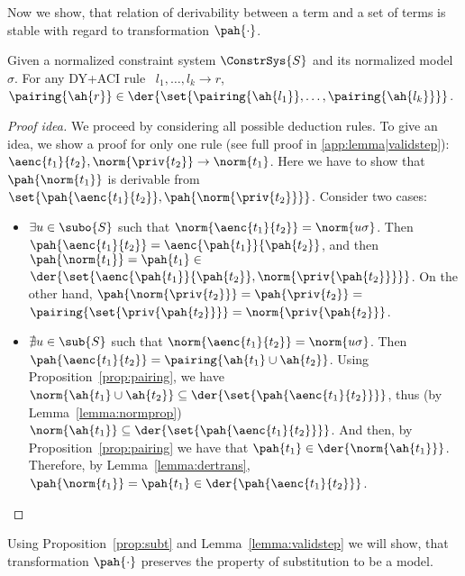 Now we show, that relation of derivability between a term and a set of terms is stable with regard to transformation $\pah{\cdot}$. 

\begin{lemma}\label{lemma:validstep}
Given a normalized constraint system $\ConstrSys{S}$ and its normalized model $\sigma$.
For any DY+ACI rule \ ${l_1,\dots,l_k}\rightarrow r$, \br $\pairing{\ah{r}} \in \der{\set{\pairing{\ah{l_1}}, \dots, \pairing{\ah{l_k}}} }$.


\begin{proof}[Proof idea] 
We proceed by considering all possible deduction rules. To give an idea, we show a proof for only one rule (see full proof in \ref{app:lemma|validstep}):
  	${\aenc{t_1}{t_2},\norm{\priv{t_2}}} \rightarrow \norm{t_1}$. Here we have to show that $\pah{\norm{t_1}}$ is derivable from $\set{\pah{\aenc{t_1}{t_2}}, \pah{\norm{\priv{t_2}}}}$.
	Consider two cases:
  	\begin{itemize}
		\item $\exists u\in \subo{S}$ such that $\norm{\aenc{t_1}{t_2}}=\norm{u\sigma}$. Then \br $\pah{\aenc{t_1}{t_2}}  = \aenc{\pah{t_1}}{\pah{t_2}}$, \br and then 
		$\pah{\norm{t_1}}=\pah{t_1} \in   $ \br $ \der{\set{\aenc{\pah{t_1}}{\pah{t_2}},\norm{\priv{\pah{t_2}}}}}$. \br
		On the other hand, $\pah{\norm{\priv{t_2}}} = \pah{\priv{t_2}} =  $ \br $ \pairing{\set{\priv{\pah{t_2}}}}=\norm{\priv{\pah{t_2}}}$.
		
		\item $\nexists u\in \sub{S}$ such that $\norm{\aenc{t_1}{t_2}}=\norm{u\sigma}$. 
		 Then \br $\pah{\aenc{t_1}{t_2}} = \pairing{\ah{t_1}\cup \ah{t_2}}$. Using Proposition~\ref{prop:pairing}, we have $\norm{\ah{t_1}\cup \ah{t_2}} \subseteq \der{\set{\pah{\aenc{t_1}{t_2}}}}$, thus (by Lemma~\ref{lemma:normprop}) $\norm{\ah{t_1}}\subseteq \der{\set{\pah{\aenc{t_1}{t_2}}}}$. And then, by Proposition~\ref{prop:pairing} we have that $\pah{t_1} \in \der{\norm{\ah{t_1}}}$. Therefore, by Lemma~\ref{lemma:dertrans},   $\pah{\norm{t_1}}=\pah{t_1} \in \der{\pah{\aenc{t_1}{t_2}}}$.
	\end{itemize}
\end{proof}

\end{lemma}

Using Proposition~\ref{prop:subt} and Lemma~\ref{lemma:validstep} we will show, that transformation $\pah{\cdot}$ preserves the property of substitution to be a model. 

